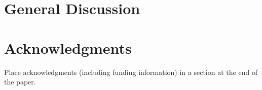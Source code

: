 \documentclass[10pt,letterpaper]{article}
\begin{document}
\section{General Discussion}


\section{Acknowledgments}

Place acknowledgments (including funding information) in a section at
the end of the paper.



\setlength{\bibleftmargin}{.125in}
\setlength{\bibindent}{-\bibleftmargin}


\end{document}
